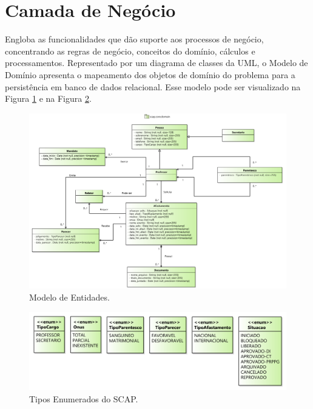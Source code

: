 \section{Camada de Negócio}
\label{sec-arquitetura-negocio}


Engloba as funcionalidades que dão suporte aos processos de negócio, concentrando as regras de negócio, conceitos do domínio, cálculos e processamentos. Representado por um diagrama de classes da UML, o Modelo de Domínio apresenta o mapeamento dos objetos de domínio do problema para a persistência em banco de dados relacional. Esse modelo pode ser visualizado na Figura \ref{figura-arquitetura-entidade} e na Figura \ref{figura-arquitetura-enum}.  

\begin{figure}[h]
	\centering
	\includegraphics[width=1\textwidth]{figuras/figura-arquitetura-entidade.png}
	\caption{Modelo de Entidades.}
	\label{figura-arquitetura-entidade}
\end{figure}

\begin{figure}[h]
	\centering
	\includegraphics[width=1\textwidth]{figuras/figura-arquitetura-enum.png}
	\caption{Tipos Enumerados do SCAP.}
	\label{figura-arquitetura-enum}
\end{figure}

